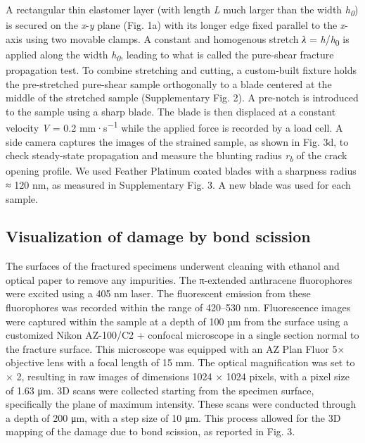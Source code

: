 \documentclass{article}
\begin{document}
A rectangular thin elastomer layer (with length \emph{L} much larger than the width \emph{h}\textsubscript{\emph{0}}) is secured on the \emph{x}-\emph{y} plane (Fig. 1a) with its longer edge fixed parallel to the \emph{x}-axis using two movable clamps. A constant and homogenous stretch \emph{λ} = \emph{h}/\emph{h}\textsubscript{0} is applied along the width \emph{h}\textsubscript{\emph{0}}, leading to what is called the pure-shear fracture propagation test. To combine stretching and cutting, a custom-built fixture holds the pre-stretched pure-shear sample orthogonally to a blade centered at the middle of the stretched sample (Supplementary Fig. 2). A pre-notch is introduced to the sample using a sharp blade. The blade is then displaced at a constant velocity \emph{V} = 0.2 mm·s\textsuperscript{−1} while the applied force is recorded by a load cell. A side camera captures the images of the strained sample, as shown in Fig. 3d, to check steady-state propagation and measure the blunting radius \emph{r}\textsubscript{\emph{b}} of the crack opening profile. We used Feather Platinum coated blades with a sharpness radius ≈ 120 nm, as measured in Supplementary Fig. 3. A new blade was used for each sample.

\subsection*{Visualization of damage by bond scission}

The surfaces of the fractured specimens underwent cleaning with ethanol and optical paper to remove any impurities. The π-extended anthracene fluorophores were excited using a 405 nm laser. The fluorescent emission from these fluorophores was recorded within the range of 420–530 nm. Fluorescence images were captured within the sample at a depth of 100 µm from the surface using a customized Nikon AZ-100/C2 + confocal microscope in a single section normal to the fracture surface. This microscope was equipped with an AZ Plan Fluor 5× objective lens with a focal length of 15 mm. The optical magnification was set to × 2, resulting in raw images of dimensions 1024 × 1024 pixels, with a pixel size of 1.63 μm. 3D scans were collected starting from the specimen surface, specifically the plane of maximum intensity. These scans were conducted through a depth of 200 μm, with a step size of 10 μm. This process allowed for the 3D mapping of the damage due to bond scission, as reported in Fig. 3.
\end{document}

